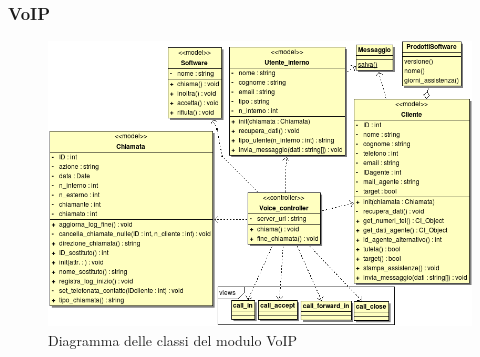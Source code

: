 \subsubsection{VoIP}
\begin{figure}[!ht]
\centering
  \includegraphics[scale=0.7]{./images/VoIPMVC.png}
\caption{Diagramma delle classi del modulo VoIP}
\label{voip}
\end{figure}


